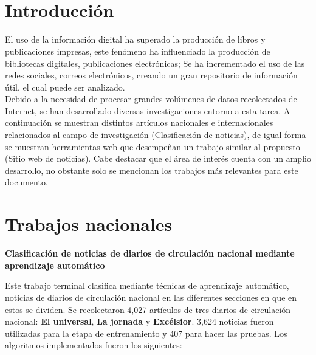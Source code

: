 
\ \\\\
\section{Introducción}


El uso de la información digital ha superado la producción de libros y publicaciones impresas, este fenómeno ha influenciado la producción de bibliotecas digitales, publicaciones electrónicas; Se ha incrementado el uso de las redes sociales, correos electrónicos, creando un gran repositorio de información útil, el cual puede ser analizado\cite{machine}.\\

Debido a la necesidad de procesar grandes volúmenes de datos recolectados de Internet, se han desarrollado diversas investigaciones entorno a esta tarea. A continuación se muestran distintos artículos nacionales e internacionales relacionados al campo de investigación (Clasificación de noticias), de igual forma se muestran herramientas web que desempeñan un trabajo similar al propuesto (Sitio web de noticias). Cabe destacar que el área de interés cuenta con un amplio desarrollo, no obstante solo se mencionan los trabajos más relevantes para este documento.


\section{Trabajos nacionales}

\begin{large}
	 \textbf{Clasificación de noticias de diarios de circulación nacional mediante aprendizaje automático }\\
\end{large}


Este trabajo terminal clasifica mediante técnicas de aprendizaje automático, noticias
de diarios de circulación nacional en las diferentes secciones en que en estos se dividen. Se recolectaron 4,027 artículos de tres diarios de circulación nacional: \textbf{El universal}, \textbf{La jornada} y \textbf{Excélsior}. 3,624 noticias fueron utilizadas para la etapa de entrenamiento y 407 para hacer las pruebas. Los algoritmos implementados fueron los siguientes: \\


